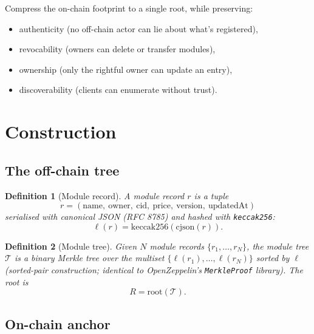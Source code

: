 \documentclass[11pt,a4paper]{article}
\newtheorem{definition}{Definition}[section]
\begin{document}
Compress the on-chain footprint to a single root, while preserving:

\begin{itemize}
    \item authenticity (no off-chain actor can lie about what's registered),
    \item revocability (owners can delete or transfer modules),
    \item ownership (only the rightful owner can update an entry),
    \item discoverability (clients can enumerate without trust).
\end{itemize}

\section{Construction}

\subsection{The off-chain tree}

\begin{definition}[Module record]
A module record $r$ is a tuple
\[
r = (\text{name},\ \text{owner},\ \text{cid},\ \text{price},\ \text{version},\ \text{updatedAt})
\]
serialised with canonical JSON (RFC 8785) and hashed with \texttt{keccak256}:
\[
\ell(r) = \mathrm{keccak256}(\mathrm{cjson}(r)).
\]
\end{definition}

\begin{definition}[Module tree]
Given $N$ module records $\{r_1, \ldots, r_N\}$, the module tree $\mathcal{T}$ is a binary Merkle tree over the multiset $\{\ell(r_1), \ldots, \ell(r_N)\}$ sorted by $\ell$ (sorted-pair construction; identical to OpenZeppelin's \texttt{MerkleProof} library). The root is
\[
R = \mathrm{root}(\mathcal{T}).
\]
\end{definition}

\subsection{On-chain anchor}
\end{document}

